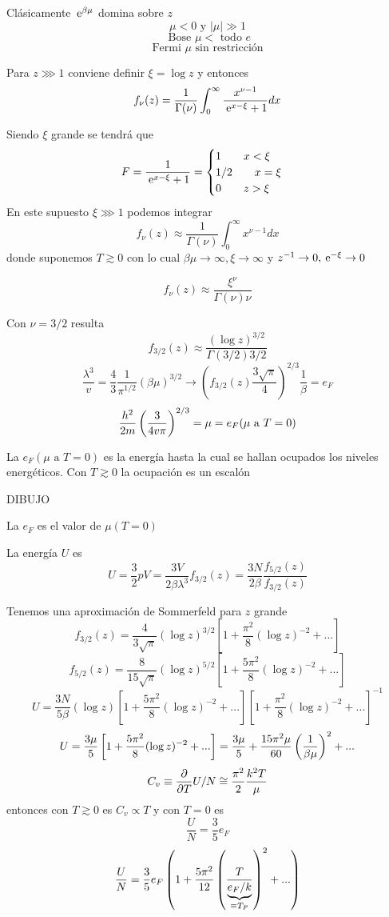 \documentclass[10pt,oneside]{CBFT_book}
\begin{document}
Clásicamente $\:\mathrm{e}^{\beta\mu}$ domina sobre $z$
\[
	\mu < 0 \text{ y } |\mu| \gg 1 
\]
\[
	\text{ Bose } \mu < \text{ todo } e
\]
\[
	\text{ Fermi } \mu \text{ sin restricción }
\]


Para $ z \ggg 1 $ conviene definir $ \xi = \log z $ y entonces 
\[
	f_\nu(z) = \frac{1}{\Gamma(\nu)} \int_0^\infty \frac{x^{\nu-1}}{\:\mathrm{e}^{x-\xi}+1} dx
\]

Siendo $\xi$ grande se tendrá que 
\[
	F = \frac{ 1 }{ \:\mathrm{e}^{x-\xi} + 1 } = \begin{cases}
	                  1 \qquad x < \xi \\
	                  1/2 \qquad x=\xi \\
	                  0 \qquad z > \xi
	                 \end{cases}
\]
En este supuesto $ \xi \ggg 1 $ podemos integrar
\[
	f_\nu(z) \approx \frac{1}{\Gamma(\nu)} \int_0^\infty x^{\nu-1} dx
\]
donde suponemos $ T \gtrsim 0 $ con lo cual $ \beta\mu \to \infty, \xi \to \infty$ y 
$z^{-1} \to 0, \:\mathrm{e}^{-\xi} \to 0$

\[
	f_\nu(z) \approx \frac{ \xi^\nu }{\Gamma(\nu) \nu}
\]

Con $ \nu = 3/2 $ resulta 
\[
	f_{3/2}(z) \approx \frac{ (\log z)^{3/2} }{\Gamma(3/2) 3/2}
\]
\[
	\frac{\lambda^3}{v} = \frac{4}{3} \frac{1}{\pi^{1/2}}(\beta\mu)^{3/2} \to
	\left( f_{3/2}(z) \frac{3\sqrt{\pi}}{4}\right)^{2/3} \frac{1}{\beta} = e_F
\]
\[
	\frac{h^2}{2m} \left( \frac{ 3 }{ 4v\pi } \right)^{2/3} = \mu = e_F (\mu \text{ a } T=0 )
\]

La $e_F (\mu \text{ a } T=0 )$ es la energía hasta la cual se hallan ocupados los
niveles energéticos. Con $ T \gtrsim 0$ la ocupación es un escalón

DIBUJO 

La $e_F$ es el valor de $\mu (T=0)$

La energía $U$ es 
\[
	U  = \frac{3}{2} p V = \frac{3V}{2\beta\lambda^3} f_{3/2}(z) = \frac{3N}{2\beta} \frac{f_{5/2}(z)}{f_{3/2}(z)}
\]

Tenemos una aproximación de Sommerfeld para $z$ grande 
\[
	f_{3/2}(z) = \frac{ 4 }{ 3\sqrt{\pi} } (\log z)^{3/2} \left[ 1 + \frac{\pi^2}{8}(\log z)^{-2} + ... \right]
\]
\[
	f_{5/2}(z) = \frac{ 8 }{ 15\sqrt{\pi} } (\log z)^{5/2} \left[ 1 + \frac{5\pi^2}{8}(\log z)^{-2} + ... \right]
\]
\[
	U = \frac{ 3N }{ 5\beta } (\log z) 
	\left[ 1 + \frac{5\pi^2}{8}(\log z)^{-2} + ... \right]
	\left[ 1 + \frac{\pi^2}{8}(\log z)^{-2} + ... \right]^{-1}
\]
\[
	U = \frac{3\mu}{5} \left[ 1 + \frac{5\pi^2}{8}(\log z)^{-2} + ... \right] =
	\frac{3\mu}{5} + \frac{15\pi^2\mu}{60} \left( \frac{ 1 }{ \beta\mu } \right)^2 + ...
\]
\[
	C_v \equiv \frac{\partial^{\hspace{-0.05em}} {}}{\partial {T}^{\hspace{-0.05em}}}U/N \cong \frac{\pi^2}{2} \frac{k^2 T}{\mu}
\]
entonces con $T \gtrsim 0$ es $C_v \propto T$ y con $T=0$ es
\[
	\frac{ U}{N} = \frac{3}{5} e_F
\]
\[
	\frac{ U}{N} = \frac{3}{5} e_F \left( 1 + \frac{5\pi^2}{12} 
	\left( \frac{ T }{ \underbrace{e_F/k}_{\equiv T_F} } \right)^2 + ... \right) 
\]

\end{document}
